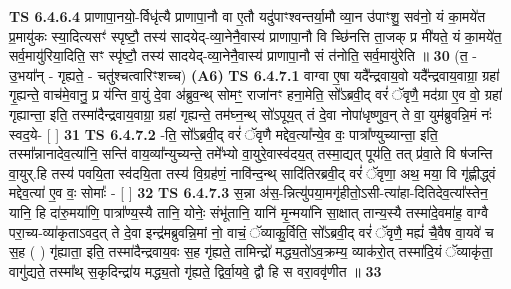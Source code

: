 \documentclass[17pt]{extarticle}
\begin{document}
                                \textbf{ TS 6.4.6.4} \newline
                  प्राणापा॒नयो॒-र्विधृ॑त्यै प्राणापा॒नौ वा ए॒तौ यदु॑पाꣳश्वन्तर्या॒मौ व्या॒न उ॑पाꣳशु॒ सव॑नो॒ यं का॒मये॑त प्र॒मायु॑कः स्या॒दित्यसꣳ॑ स्पृष्टौ॒ तस्य॑ सादयेद्-व्या॒नेनै॒वास्य॑ प्राणापा॒नौ वि च्छि॑नत्ति ता॒जक् प्र मी॑यते॒ यं का॒मये॑त॒ सर्व॒मायु॑रिया॒दिति॒ सꣳ स्पृ॑ष्टौ॒ तस्य॑ सादयेद्-व्या॒नेनै॒वास्य॑ प्राणापा॒नौ सं त॑नोति॒ सर्व॒मायु॑रेति ॥ \textbf{  30} \newline
                  \newline
                      (त॒ - उ॒भया᳚न् - गृह्यते॒ - चतु॑श्चत्वारिꣳशच्च)  \textbf{(A6)} \newline \newline
                                        \textbf{ TS 6.4.7.1} \newline
                  वाग्वा ए॒षा यदै᳚न्द्रवाय॒वो यदै᳚न्द्रवाय॒वाग्रा॒ ग्रहा॑ गृ॒ह्यन्ते॒ वाच॑मे॒वानु॒ प्र य॑न्ति वा॒युं दे॒वा अ॑ब्रुव॒न्थ् सोमꣳ॒॒ राजा॑नꣳ हना॒मेति॒ सो᳚ऽब्रवी॒द् वरं॑ ॅवृणै॒ मद॑ग्रा ए॒व वो॒ ग्रहा॑ गृह्यान्ता॒ इति॒ तस्मा॑दैन्द्रवाय॒वाग्रा॒ ग्रहा॑ गृह्यन्ते॒ तम॑घ्न॒न्थ् सो॑ऽपूय॒त् तं दे॒वा नोपा॑धृष्णुव॒न् ते वा॒ युम॑ब्रुवन्नि॒मं नः॑ स्वद॒ये- [  ] \textbf{  31} \newline
                  \newline
                                \textbf{ TS 6.4.7.2} \newline
                  -ति॒ सो᳚ऽब्रवी॒द् वरं॑ ॅवृणै मद्देव॒त्या᳚न्ये॒व वः॒ पात्रा᳚ण्युच्यान्ता॒ इति॒ तस्मा᳚न्नानादेव॒त्या॑नि॒ सन्ति॑ वाय॒व्या᳚न्युच्यन्ते॒ तमे᳚भ्यो वा॒युरे॒वास्व॑दय॒त् तस्मा॒द्यत् पूय॑ति॒ तत् प्र॑वा॒ते वि ष॑जन्ति वा॒युर्.हि तस्य॑ पवयि॒ता स्व॑दयि॒ता तस्य॑ वि॒ग्रह॑णं॒ नावि॑न्द॒न्थ् सादि॑तिरब्रवी॒द् वरं॑ ॅवृणा॒ अथ॒ मया॒ वि गृ॑ह्णीद्ध्वं मद्देव॒त्या॑ ए॒व वः॒ सोमाः᳚ - [  ] \textbf{  32} \newline
                  \newline
                                \textbf{ TS 6.4.7.3} \newline
                  स॒न्ना अ॑स॒-न्नित्यु॑पया॒मगृ॑हीतो॒ऽसी-त्या॑हा-दितिदेव॒त्या᳚स्तेन॒ यानि॒ हि दा॑रु॒मया॑णि॒ पात्रा᳚ण्य॒स्यै तानि॒ योनेः॒ संभू॑तानि॒ यानि॑ मृ॒न्मया॑नि सा॒क्षात् तान्य॒स्यै तस्मा॑दे॒वमा॑ह॒ वाग्वै परा॒च्य-व्या॑कृताऽवद॒त् ते दे॒वा इन्द्र॑मब्रुवन्नि॒मां नो॒ वाचं॒ ॅव्याकु॒र्विति॒ सो᳚ऽब्रवी॒द् वरं॑ ॅवृणै॒ मह्यं॑ चै॒वैष वा॒यवे॑ च स॒ह ( ) गृ॑ह्याता॒ इति॒ तस्मा॑दैन्द्रवाय॒वः स॒ह गृ॑ह्यते॒ तामिन्द्रो॑ मद्ध्य॒तो॑ऽव॒क्रम्य॒ व्याक॑रो॒त् तस्मा॑दि॒यं ॅव्याकृ॑ता॒ वागु॑द्यते॒ तस्मा᳚थ् स॒कृदिन्द्रा॑य मद्ध्य॒तो गृ॑ह्यते॒ द्विर्वा॒यवे॒ द्वौ हि स वरा॒ववृ॑णीत ॥ \textbf{  33} \newline
\end{document}

